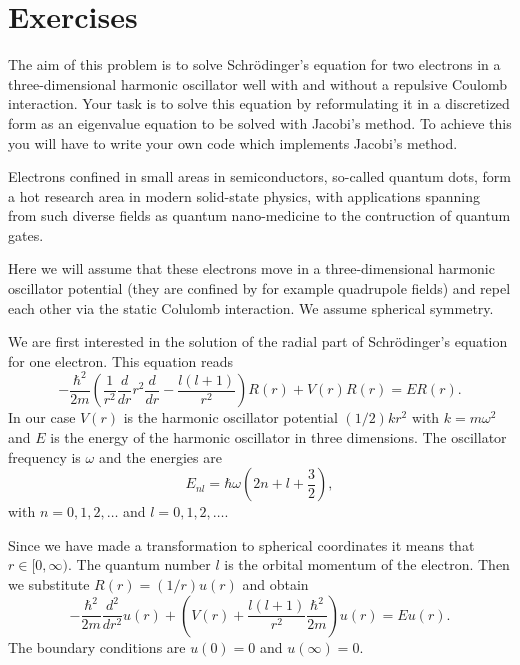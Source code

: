 \section{Exercises}
\begin{prob}
The aim of this problem is to solve Schr\"odinger's equation for two electrons in a three-dimensional harmonic oscillator well with and without a repulsive 
Coulomb interaction.  Your task is to solve this equation by reformulating it
in a discretized form
as an eigenvalue equation to be solved with Jacobi's method. To achieve this
you will have to write your own code which implements Jacobi's method.

Electrons confined in small areas in semiconductors, so-called quantum dots,
form a hot research area in modern solid-state physics, with applications
spanning from such diverse fields as quantum nano-medicine to the contruction
of quantum gates.

Here we will assume that these electrons move in a three-dimensional harmonic
oscillator potential (they are confined by for example quadrupole fields)
and repel  each other via the static Colulomb interaction.  
We assume spherical symmetry.  

We are first interested in the solution of the radial part of Schr\"odinger's equation for one electron. This equation reads
\[
  -\frac{\hbar^2}{2 m} \left ( \frac{1}{r^2} \frac{d}{dr} r^2
  \frac{d}{dr} - \frac{l (l + 1)}{r^2} \right )R(r) 
     + V(r) R(r) = E R(r).
\]
In our case $V(r)$ is the harmonic oscillator potential $(1/2)kr^2$ with
$k=m\omega^2$ and $E$ is
the energy of the harmonic oscillator in three dimensions.
The oscillator frequency is $\omega$ and the energies are
\[
E_{nl}=  \hbar \omega \left(2n+l+\frac{3}{2}\right),
\]
with $n=0,1,2,\dots$ and $l=0,1,2,\dots$.
 
Since we have made a transformation to spherical coordinates it means that 
$r\in [0,\infty)$.  
The quantum number
$l$ is the orbital momentum of the electron.  
%
Then we substitute $R(r) = (1/r) u(r)$ and obtain
%
\[
  -\frac{\hbar^2}{2 m} \frac{d^2}{dr^2} u(r) 
       + \left ( V(r) + \frac{l (l + 1)}{r^2}\frac{\hbar^2}{2 m}
                                    \right ) u(r)  = E u(r) .
\]
%
The boundary conditions are $u(0)=0$ and $u(\infty)=0$.


\end{prob}
